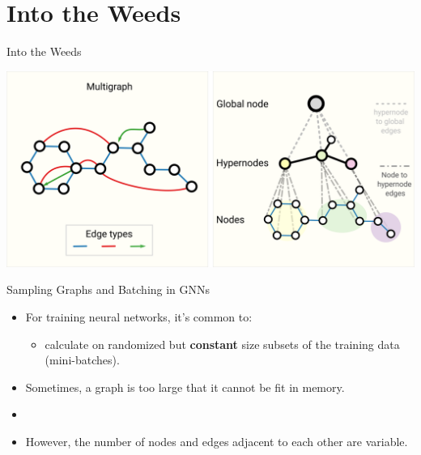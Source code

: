 \documentclass[
    11pt, %
    aspectratio=169, %
]{beamer}
\begin{document}
\section{Into the Weeds}
\begin{frame}
	\centering
	\large
	Into the Weeds
\end{frame}
\begin{frame}{}
    \centering
    \includegraphics[width=.8\textwidth]{Images/multigraphs.png}
\end{frame}

\begin{frame}
    \centering
    \Large
    Sampling Graphs and Batching in GNNs
\end{frame}

\begin{frame}
    \begin{itemize}[<+->]
        \item For training neural networks, it's common to:
        \begin{itemize}
            \item calculate on randomized but \textbf{constant} size subsets of the training data (mini-batches).
        \end{itemize}
        \item Sometimes, a graph is too large that it cannot be fit in memory.
        \item[]
        \item However, the number of nodes and edges adjacent to each other are variable.
    \end{itemize}
\end{frame}
\end{document}
